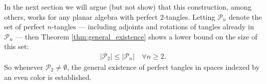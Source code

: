 In the next section we will argue (but not show) that this construction, among others, works for any planar algebra with perfect $2$-tangles. Letting $\mathcal{P}_n$ denote the set of perfect $n$-tangles --- including adjoints and rotations of tangles already in $\mathcal{P}_n$ --- then \textsf{Theorem \ref{thm:general_existence}} shows a lower bound on the size of this set:
\begin{align}\label{eq:lower_bound no1}
\lvert \mathcal{P}_2 \rvert \leq \lvert \mathcal{P}_n \rvert \quad \forall n\geq 2.
\end{align}
So whenever $\mathcal{P}_2\neq \emptyset$, the general existence of perfect tangles in spaces indexed by an even color is established.

%
%
%
%
